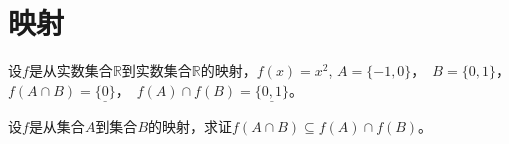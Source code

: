 \chapter{映射}
\begin{Ex}
设$f$是从实数集合$\mathbb{R}$到实数集合$\mathbb{R}$的映射，$f(x) = x^2$,
$A=\{-1,0\}$，　$B=\{0,1\}$，$f(A \cap B)=\underline{\{0\}}$，　$f(A) \cap
f(B) = \underline{\{0,1\}}$。
\end{Ex}

\begin{Ex}
设$f$是从集合$A$到集合$B$的映射，求证$f(A \cap B) \subseteq f(A) \cap f(B)$。
\end{Ex}
